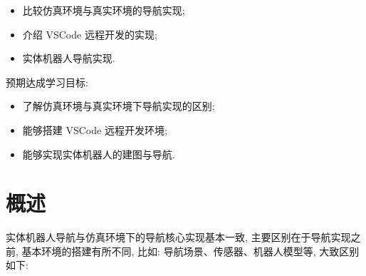 \documentclass[openany, fontset=windowsold]{ctexbook}
\theoremstyle{kaiti}
\theoremstyle{normal}
\begin{document}
\begin{itemize}
  \item 比较仿真环境与真实环境的导航实现; 
  \item 介绍 VSCode 远程开发的实现; 
  \item 实体机器人导航实现.
\end{itemize}

预期达成学习目标: 

\begin{itemize}
  \item 了解仿真环境与真实环境下导航实现的区别; 
  \item 能够搭建 VSCode 远程开发环境; 
  \item 能够实现实体机器人的建图与导航.
\end{itemize}

\section{概述}

实体机器人导航与仿真环境下的导航核心实现基本一致, 主要区别在于导航实现之前, 基本环境的搭建有所不同, 比如: 导航场景、传感器、机器人模型等, 大致区别如下:
\end{document}
